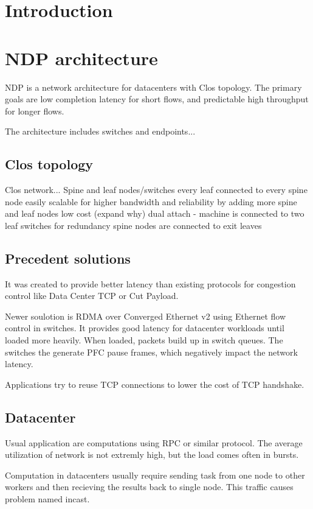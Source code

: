 \chapter{Introduction}


\chapter{NDP architecture}
NDP is a network architecture for datacenters with Clos topology. 
The primary goals are low completion latency for short flows, and predictable high throughput for longer flows.

The architecture includes switches and endpoints...


\section{Clos topology}
Clos network...
Spine and leaf nodes/switches
every leaf connected to every spine node
easily scalable for higher bandwidth and reliability by adding more spine and leaf nodes
low cost (expand why)
dual attach - machine is connected to two leaf switches for redundancy
spine nodes are connected to exit leaves


\section{Precedent solutions}
It was created to provide better latency than existing protocols for congestion control like Data Center TCP or Cut Payload.

Newer soulotion is RDMA over Converged Ethernet v2 using Ethernet flow control in switches. It provides good latency for datacenter workloads until loaded more heavily.
When loaded, packets build up in switch queues. The switches the generate PFC pause frames, which negatively impact the network latency.

Applications try to reuse TCP connections to lower the cost of TCP handshake.


\section{Datacenter}
Usual application are computations using RPC or similar protocol. The average utilization of network is not extremly high, but the load comes often in bursts.

Computation in datacenters usually require sending task from one node to other workers and then recieving the results back to single node. This traffic causes problem named incast.


